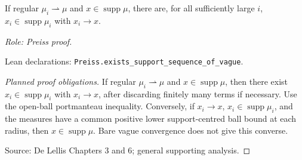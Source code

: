 \begin{lemma}
\label{lem:vague-support-approximation}







If regular $\mu_i\rightharpoonup\mu$ and $x\in\operatorname{supp}\mu$, there are, for all sufficiently large $i$, $x_i\in\operatorname{supp}\mu_i$ with $x_i\to x$.
\par\emph{Role: Preiss proof.}
\par Lean declarations: \texttt{Preiss.exists\_support\_sequence\_of\_vague}.
\end{lemma}
\begin{proof}[Planned proof obligations]

If regular $\mu_i\rightharpoonup\mu$ and $x\in\operatorname{supp}\mu$, then
there exist $x_i\in\operatorname{supp}\mu_i$ with $x_i\to x$, after discarding
finitely many terms if necessary. Use the open-ball portmanteau inequality.
Conversely, if $x_i\to x$, $x_i\in\operatorname{supp}\mu_i$, and the measures
have a common positive lower support-centred ball bound at each radius, then
$x\in\operatorname{supp}\mu$. Bare vague convergence does not give this converse.
\par Source: De Lellis Chapters 3 and 6; general supporting analysis.
\end{proof}

